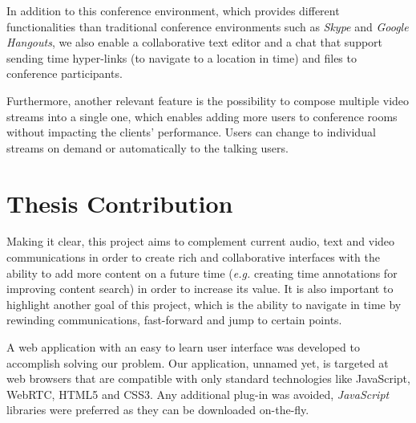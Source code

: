 
	In addition to this conference environment, which provides different functionalities than traditional conference environments such as \emph{Skype} and \emph{Google Hangouts}, we also enable a collaborative text editor and a chat that support sending time hyper-links (to navigate to a location in time) and files to conference participants.

	Furthermore, another relevant feature is the possibility to compose multiple video streams into a single one, which enables adding more users to conference rooms without impacting the clients' performance. Users can change to individual streams on demand or automatically to the talking users.

        

\section{Thesis Contribution}
\label{section:contribution}

Making it clear, this project aims to complement current audio, text and video communications in order to create rich and collaborative interfaces with the ability to add more content on a future time (\emph{e.g.} creating time annotations for improving content search) in order to increase its value. It is also important to highlight another goal of this project, which is the ability to navigate in time by rewinding communications, fast-forward and jump to certain points.


A web application with an easy to learn user interface was developed to accomplish solving our problem. Our application, unnamed yet, is targeted at web browsers that are compatible with only standard technologies like JavaScript, \ac{WebRTC}, \ac{HTML}5 and \ac{CSS}3. Any additional plug-in was avoided, \emph{JavaScript} libraries were preferred as they can be downloaded on-the-fly.



